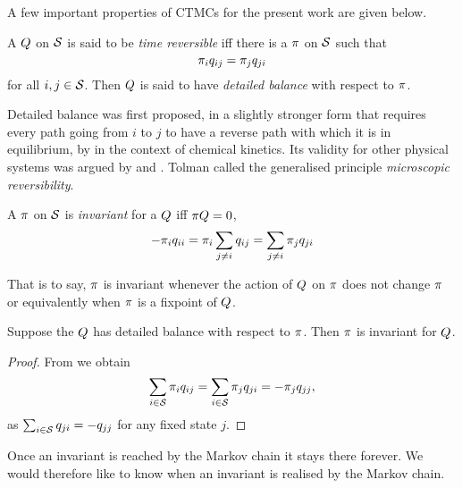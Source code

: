 A few important properties of CTMCs
for the present work are given below.

\begin{definition}
  A \qmatrix $Q$ on $\mathcal{S}$
  is said to be \emph{time reversible} iff
  there is a \pmf $\pi$ on $\mathcal{S}$ such that
  \begin{equation}
    \label{eq:detailed-balance}
    \pi_i q_{ij} = \pi_j q_{ji}
  \end{equation}
  for all $i,j \in \mathcal{S}$.
  Then $Q$ is said to have \emph{detailed balance}
  with respect to $\pi$.
\end{definition}

Detailed balance was first proposed,
in a slightly stronger form
that requires every path going from $i$ to $j$
to have a reverse path with which it is in equilibrium,
by \citet{wegscheider} in the context of chemical kinetics.
Its validity for other physical systems was argued by
\citet{lewis} and \citet{tolman}.
Tolman called the generalised principle
\emph{microscopic reversibility}.

\begin{definition}
  A \pmf $\pi$ on $\mathcal{S}$ is
  \emph{invariant} for a \qmatrix $Q$
  iff $\pi Q = 0$, \ie
  \[ -\pi_i q_{ii} = \pi_i \sum_{j \neq i} q_{ij}
                  = \sum_{j \neq i} \pi_j q_{ji} \]
\end{definition}

That is to say, $\pi$ is invariant
whenever the action of $Q$ on $\pi$ does not change $\pi$
or equivalently when $\pi$ is a fixpoint of $Q$.

\begin{lemma}
  Suppose the \qmatrix $Q$
  has detailed balance with respect to $\pi$.
  Then $\pi$ is invariant for $Q$.
\end{lemma}
\begin{proof}
  From  we obtain
  \[ \sum_{i \in \mathcal{S}} \pi_i q_{ij} =
     \sum_{i \in \mathcal{S}} \pi_j q_{ji} = -\pi_j q_{jj}, \]
  as $\sum_{i \in \mathcal{S}} q_{ji} = -q_{jj}$ for any fixed state $j$.
\end{proof}

Once an invariant \pmf is reached by the Markov chain
it stays there forever.
We would therefore like to know when an invariant
\pmf is realised by the Markov chain.

